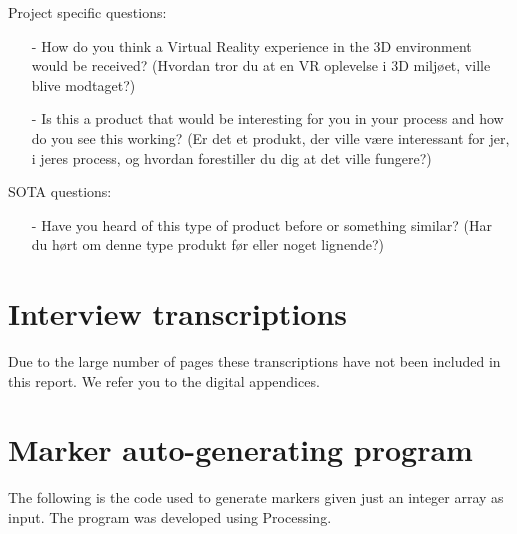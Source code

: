 Project specific questions:
\begin{itemize}
	\item[-] How do you think a Virtual Reality experience in the 3D environment would be received? (Hvordan tror du at en VR oplevelse i 3D miljøet, ville blive modtaget?)
	\item[-] Is this a product that would be interesting for you in your process and how do you see this working? (Er det et produkt, der ville være interessant for jer, i jeres process, og hvordan forestiller du dig at det ville fungere?)\\
\end{itemize}

SOTA questions:
\begin{itemize}
	\item[-] Have you heard of this type of product before or something similar? (Har du hørt om denne type produkt før eller noget lignende?)
\end{itemize}

\section*{Interview transcriptions}\label{interviewTranscriptions}
Due to the large number of pages these transcriptions have not been included in this report. We refer you to the digital appendices.
\begin{comment}




\end{comment}
\section*{Marker auto-generating program}
The following is the code used to generate markers given just an integer array as input. The program was developed using Processing.


